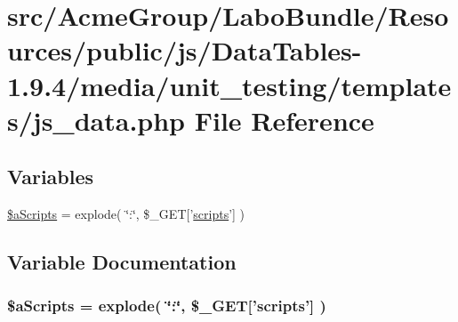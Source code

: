 \hypertarget{js__data_8php}{\section{src/\+Acme\+Group/\+Labo\+Bundle/\+Resources/public/js/\+Data\+Tables-\/1.9.4/media/unit\+\_\+testing/templates/js\+\_\+data.php File Reference}
\label{js__data_8php}
}
\subsection*{Variables}
\begin{DoxyCompactItemize}
\item 
\hyperlink{js__data_8php_a3e8e1608000c9afdd05327fc2b06b056}{\$a\+Scripts} = explode( \char`\"{}\+:\char`\"{}, \$\+\_\+\+G\+E\+T\mbox{[}'\hyperlink{tinymce_8jquery_8dev_8js_a09066d4d580eeec222f858d588b4cdef}{scripts}'\mbox{]} )
\end{DoxyCompactItemize}


\subsection{Variable Documentation}
\hypertarget{js__data_8php_a3e8e1608000c9afdd05327fc2b06b056}{
\subsubsection[{\$a\+Scripts}]{\setlength{\rightskip}{0pt plus 5cm}\$a\+Scripts = explode( \char`\"{}\+:\char`\"{}, \$\+\_\+\+G\+E\+T\mbox{[}'{\bf scripts}'\mbox{]} )}}\label{js__data_8php_a3e8e1608000c9afdd05327fc2b06b056}

